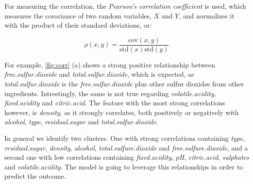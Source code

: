 \documentclass[11pt,twoside]{article}
\numberwithin{Theorem}{section}
\numberwithin{Definition}{section}
\numberwithin{Lemma}{section}
\numberwithin{Algorithm}{section}
\numberwithin{equation}{section}
\begin{document}
For measuring the correlation, the \textit{Pearson's correlation coefficient} is used, which measures the covariance of two random variables, $X$ and $Y$, and normalizes it with the product of their standard deviations, or:

\begin{equation}
\rho(x,y) = \frac{\text{cov}(x,y)}{\text{std}(x)\text{std}(y)}
\end{equation}

\begin{figure}[h]
    \centering
    \caption{}
    \label{fig:corr}
\end{figure}

For example, \autoref{fig:corr} (a) shows a strong positive relationship between \textit{free.sulfur.dioxide} and \textit{total.sulfur.dioxide}, which is expected, as \textit{total.sulfur.dioxide} is the \textit{free.sulfur.dioxide} plus other sulfur dioxides from other ingredients. Intrestingly, the same is not true regarding \textit{volatile.acidity}, \textit{fixed.acidity} and \textit{citric.acid}. The feature with the most strong correlations however, is \textit{density}, as it strongly correlates, both positively or negatively with \textit{alcohol}, \textit{type}, \textit{residual.sugar} and \textit{total.sulfur.dioxide}. 

In general we identify two clusters. One with strong correlations containing \textit{type}, \textit{residual.sugar}, \textit{density}, \textit{alcohol}, \textit{total.sulfure.dioxide} and \textit{free.sulfure.dioxide}, and a second one with low correlations containing \textit{fixed.acidity}, \textit{pH}, \textit{citric.acid}, \textit{sulphates} and \textit{volatile.acidity}. The model is going to leverage this relationships in order to predict the outcome. 
\end{document}
